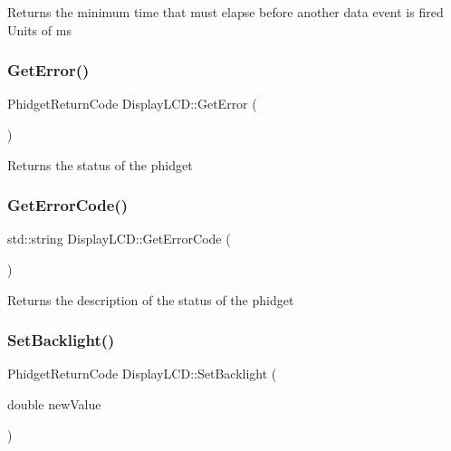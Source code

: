 Returns the minimum time that must elapse before another data event is fired Units of ms\mbox{\label{classDisplayLCD_aa1c6e2464e7a21f1d2298efb50f4f5cf}} 
\subsubsection{\texorpdfstring{Get\+Error()}{GetError()}}
{\footnotesize\ttfamily Phidget\+Return\+Code Display\+L\+C\+D\+::\+Get\+Error (\begin{DoxyParamCaption}{ }\end{DoxyParamCaption})\hspace{0.3cm}{\ttfamily [inline]}}

Returns the status of the phidget\mbox{\label{classDisplayLCD_af29a65af420a16e9995e7e2187e4af99}} 
\subsubsection{\texorpdfstring{Get\+Error\+Code()}{GetErrorCode()}}
{\footnotesize\ttfamily std\+::string Display\+L\+C\+D\+::\+Get\+Error\+Code (\begin{DoxyParamCaption}{ }\end{DoxyParamCaption})\hspace{0.3cm}{\ttfamily [inline]}}

Returns the description of the status of the phidget\mbox{\label{classDisplayLCD_acd9635087f3d813a39aa0b266f05203a}} 
\subsubsection{\texorpdfstring{Set\+Backlight()}{SetBacklight()}}
{\footnotesize\ttfamily Phidget\+Return\+Code Display\+L\+C\+D\+::\+Set\+Backlight (\begin{DoxyParamCaption}\item[{double}]{new\+Value }\end{DoxyParamCaption})\hspace{0.3cm}{\ttfamily [inline]}}


